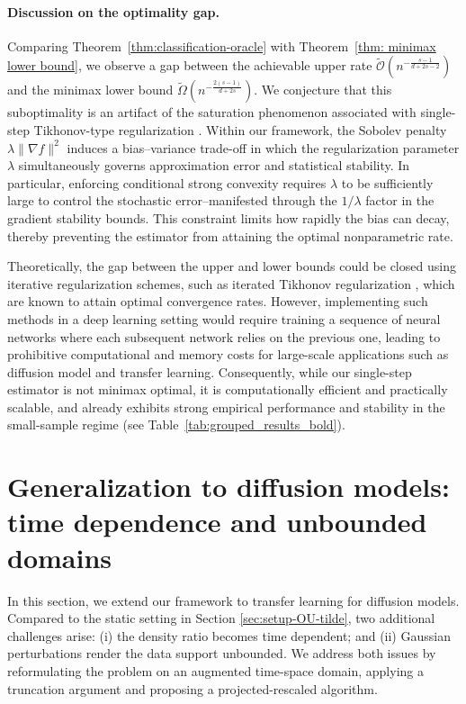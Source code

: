 \documentclass[11pt]{article}
\theoremstyle{plain}
\theoremstyle{definition}
\theoremstyle{remark}
\begin{document}
\paragraph{Discussion on the optimality gap.}
Comparing Theorem~\ref{thm:classification-oracle} with Theorem~\ref{thm: minimax lower bound}, we observe a gap between the achievable upper rate $\tilde{\mathcal{O}}(n^{-\frac{s-1}{d+2s-2}})$ and the minimax lower bound $\tilde{\Omega}(n^{-\frac{2(s-1)}{d+2s}})$.
We conjecture that this suboptimality is an artifact of the saturation phenomenon associated with single-step Tikhonov-type regularization \cite{bauer2007regularization, engl1996regularization}. Within our framework, the Sobolev penalty $\lambda \|\nabla f\|^2$  induces a bias–variance trade-off in which the regularization parameter $\lambda$ simultaneously governs approximation error and statistical stability.  In particular, enforcing conditional strong convexity requires $\lambda$ to be sufficiently large to control the stochastic error--manifested through the $1/\lambda$ factor in the gradient stability bounds. This constraint limits how rapidly the bias can decay, thereby preventing the estimator from attaining the optimal nonparametric rate.


Theoretically, the gap between the upper and lower bounds could be closed using iterative regularization schemes, such as iterated Tikhonov regularization \cite{engl1996regularization}, which are known to attain optimal convergence rates. However, implementing such methods in a deep learning setting would require training a sequence of neural networks where each subsequent network relies on the previous one, leading to prohibitive computational and memory costs for large-scale applications such as diffusion model and transfer learning. Consequently, while our single-step estimator is not minimax optimal, it is computationally efficient and practically scalable, and already exhibits strong empirical performance and stability in the small-sample regime (see Table~\ref{tab:grouped_results_bold}).

\section{Generalization to diffusion models: time dependence and unbounded domains }\label{sec:generalization}

In this section, we extend our framework to transfer learning for diffusion models. Compared to the static setting in Section \ref{sec:setup-OU-tilde}, two additional challenges arise: (i) the density ratio becomes time dependent; and (ii) Gaussian perturbations render the data support unbounded. We address both issues by reformulating the problem on an augmented time-space domain, applying a truncation argument and proposing a projected-rescaled algorithm.
\end{document}
